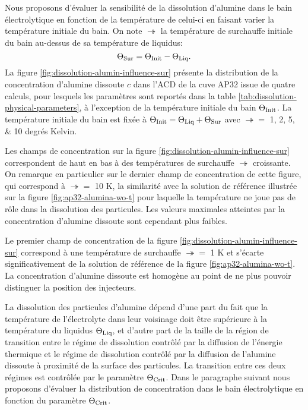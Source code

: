 

Nous proposons d'évaluer la sensibilité de la dissolution d'alumine
dans le bain électrolytique en fonction de la température de celui-ci
en faisant varier la température initiale du bain. On note $\tsur$ la
température de surchauffe initiale du bain au-dessus de sa température de
liquidus:
\begin{equation}
  \Theta_\text{Sur} = \Theta_\text{Init} - \Theta_\text{Liq}.
\end{equation}
La figure \ref{fig:dissolution-alumin-influence-sur} présente la distribution
de la concentration d'alumine dissoute $c$ dans l'ACD de la cuve AP32
issue de quatre calculs, pour lesquels les paramètres sont reportés
dans la table \ref{tab:dissolution-physical-parameters}, à
l'exception de la température initiale du bain $\Theta_\text{Init}$. La
température initiale du bain est fixée à $\Theta_\text{Init} = \Theta_\text{Liq} + \Theta_\text{Sur}$ avec
$\tsur = $ \numlist{1;2;5;10} degrés Kelvin.
\clearpage

Les champs de concentration sur la figure
\ref{fig:dissolution-alumin-influence-sur} correspondent de haut en
bas à des températures de surchauffe $\tsur$ croissante. On remarque
en particulier sur le dernier champ de concentration de cette figure,
qui correspond à $\tsur = $ \num{10} \si{\kelvin}, la similarité avec la
solution de référence illustrée sur la figure
\ref{fig:ap32-alumina-wo-t} pour laquelle la température ne joue pas
de rôle dans la dissolution des particules. Les valeurs maximales
atteintes par la concentration d'alumine dissoute sont cependant plus faibles.

Le premier champ de concentration de la figure
\ref{fig:dissolution-alumin-influence-sur} correspond à une
température de surchauffe $\tsur =$ \num{1} \si{\kelvin} et s'écarte
significativement de la solution de référence de la figure
\ref{fig:ap32-alumina-wo-t}. La concentration d'alumine dissoute est
homogène au point de ne plus pouvoir distinguer la position des
injecteurs.

La dissolution des particules d'alumine dépend d'une part du fait que
la température de l'électrolyte dans leur voisinage doit être
supérieure à la température du liquidus $\Theta_\text{Liq}$, et d'autre part de la
taille de la région de transition entre le régime de dissolution
contrôlé par la diffusion de l'énergie thermique et le régime de
dissolution contrôlé par la diffusion de l'alumine dissoute à
proximité de la surface des particules. La transition entre ces deux
régimes est contrôlée par le paramètre $\Theta_\text{Crit}$. Dans le paragraphe
suivant nous proposons d'évaluer la distribution de concentration dans
le bain électrolytique en fonction du paramètre $\Theta_\text{Crit}$.


